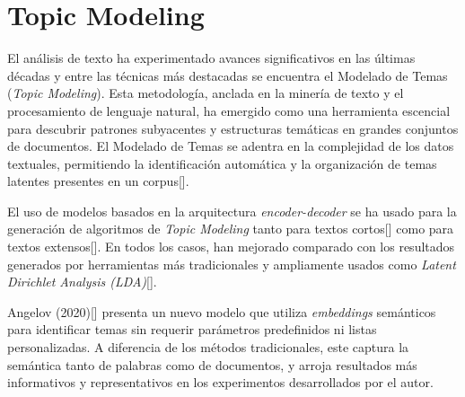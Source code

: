 \section{Topic Modeling}

    El análisis de texto ha experimentado avances significativos en las últimas décadas y entre las técnicas más destacadas se encuentra el Modelado de Temas (\emph{Topic Modeling}). Esta metodología, anclada en la minería de texto y el procesamiento de lenguaje natural, ha emergido como una herramienta escencial para descubrir patrones subyacentes y estructuras temáticas en grandes conjuntos de documentos. El Modelado de Temas se adentra en la complejidad de los datos textuales, permitiendo la identificación automática y la organización de temas latentes presentes en un corpus[\cite{lda2003}].

    El uso de modelos basados en la arquitectura \emph{encoder-decoder} se ha usado para la generación de algoritmos de \emph{Topic Modeling }tanto para textos cortos[\cite{neuraltm}] como para textos extensos[\cite{tminemb}]. En todos los casos, han mejorado comparado con los resultados generados por herramientas más tradicionales y ampliamente usados como \emph{Latent Dirichlet Analysis (LDA)}[\cite{lda2003}].  

    Angelov (2020)[\cite{angelov2020top2vec}] presenta un nuevo modelo que utiliza \emph{embeddings} semánticos para identificar temas sin requerir parámetros predefinidos ni listas personalizadas. A diferencia de los métodos tradicionales, este captura la semántica tanto de palabras como de documentos, y arroja resultados más informativos y representativos en los experimentos desarrollados por el autor.

